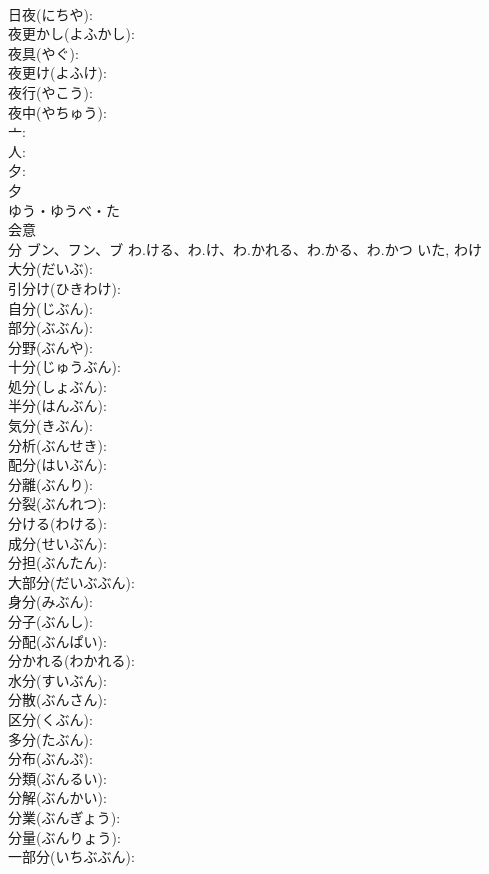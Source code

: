 \documentclass[8pt]{extreport}
\begin{document}
\begin{CJK}{UTF8}{min}
\\	日夜(にちや): 
\\	夜更かし(よふかし): 
\\	夜具(やぐ): 
\\	夜更け(よふけ): 
\\	夜行(やこう): 
\\	夜中(やちゅう): 
\\	亠: 
\\	人: 
\\	夕: 
\\	夕	
\\	ゆう・ゆうべ・た	
\\	会意 
\\	分	ブン、フン、ブ	わ.ける、わ.け、わ.かれる、わ.かる、わ.かつ	いた, わけ	
\\	大分(だいぶ): 
\\	引分け(ひきわけ): 
\\	自分(じぶん): 
\\	部分(ぶぶん): 
\\	分野(ぶんや): 
\\	十分(じゅうぶん): 
\\	処分(しょぶん): 
\\	半分(はんぶん): 
\\	気分(きぶん): 
\\	分析(ぶんせき): 
\\	配分(はいぶん): 
\\	分離(ぶんり): 
\\	分裂(ぶんれつ): 
\\	分ける(わける): 
\\	成分(せいぶん): 
\\	分担(ぶんたん): 
\\	大部分(だいぶぶん): 
\\	身分(みぶん): 
\\	分子(ぶんし): 
\\	分配(ぶんぱい): 
\\	分かれる(わかれる): 
\\	水分(すいぶん): 
\\	分散(ぶんさん): 
\\	区分(くぶん): 
\\	多分(たぶん): 
\\	分布(ぶんぷ): 
\\	分類(ぶんるい): 
\\	分解(ぶんかい): 
\\	分業(ぶんぎょう): 
\\	分量(ぶんりょう): 
\\	一部分(いちぶぶん): 

\end{CJK}
\end{document}
